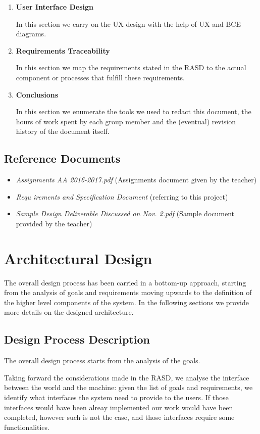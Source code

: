 \documentclass[11pt]{article} %
\begin{document}
\begin{enumerate}
	\item \textbf{User Interface Design}

	In this section we carry on the UX design with the help of UX and BCE diagrams.

	\item \textbf{Requirements Traceability}
	
	In this section we map the requirements stated in the RASD to the actual component or processes that fulfill these requirements.

	\item \textbf{Conclusions}

	In this section we enumerate the tools we used to redact this document, the hours of work spent by each group member and the (eventual) revision history of the document itself.
\end{enumerate}

\subsection{Reference Documents}
\begin{itemize}
	\item \textit{Assignments AA 2016-2017.pdf} (Assignments document given by the teacher)
	\item \textit{Requ
irements and Specification Document} (referring to this project)
	\item \textit{Sample Design Deliverable Discussed on Nov. 2.pdf} (Sample document provided by the teacher)
  \end{itemize}




\newpage
\section{Architectural Design}
The overall design process has been carried in a bottom-up approach, starting from the analysis of goals and requirements moving upwards to the definition of the higher level components of the system. In the following sections we provide more details on the designed architecture.

\subsection{Design Process Description}

The overall design process starts from the analysis of the goals. 

Taking forward the considerations made in the RASD, we analyse the interface between the world and the machine: given the list of goals and requirements, we identify what interfaces the system need to provide to the users.
If those interfaces would have been alreay implemented our work would have been completed, however such is not the case, and those interfaces require some functionalities.
\end{document}
